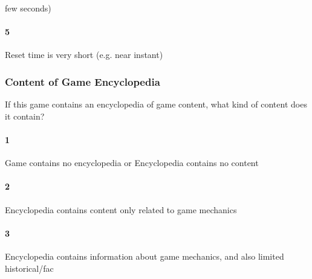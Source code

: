 few seconds)\paragraph{5}Reset time is very short (e.g. near instant)\subsubsection{Content of Game Encyclopedia}If this game contains an encyclopedia of game content, what kind of content does it contain?\paragraph{1}Game contains no encyclopedia or Encyclopedia contains no content\paragraph{2}Encyclopedia contains content only related to game mechanics\paragraph{3}Encyclopedia contains information about game mechanics, and also limited historical/fac
